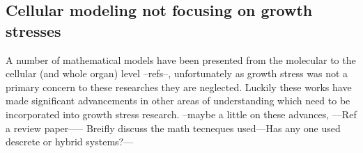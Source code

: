 \subsection{Cellular modeling not focusing on growth stresses}
A number of mathematical models have been presented from the
molecular to the cellular (and whole organ) level --refs--, unfortunately as
growth stress was not a primary concern to these researches they are neglected.
Luckily these works have made significant advancements in other areas of
understanding which need to be incorporated into growth stress research. --maybe
a little on these advances, ---Ref a review paper----- Breifly discuss the math
tecneques used---Has any one used descrete or hybrid systems?---
